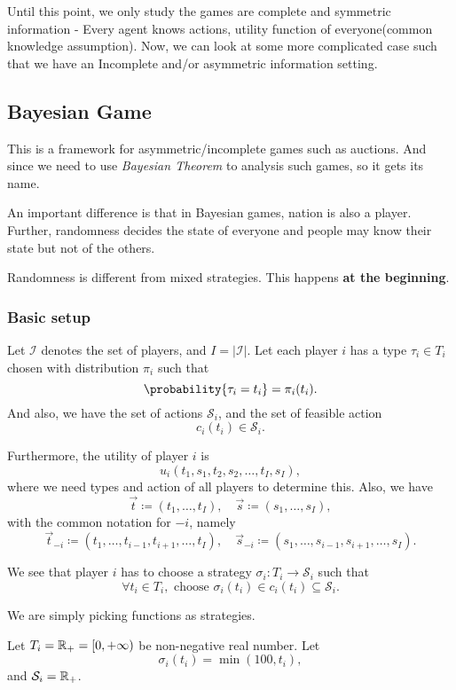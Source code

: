 \hr

Until this point, we only study the games are complete and symmetric information - Every agent knows actions, utility function of everyone(common knowledge assumption).
Now, we can look at some more complicated case such that we have an Incomplete and/or asymmetric information setting.

\subsection{Bayesian Game}
This is a framework for asymmetric/incomplete games such as auctions. And since we need to use \emph{Bayesian Theorem} to analysis such games, so
it gets its name.

An important difference is that in Bayesian games, nation is also a player. Further, randomness decides the state of everyone and people may
know their state but not of the others.

\begin{note}
	Randomness is different from mixed strategies. This happens \textbf{at the beginning}.
\end{note}

\subsubsection{Basic setup}
Let \(\mathcal{I} \) denotes the set of players, and \(I = \left\vert \mathcal{I}  \right\vert \). Let each player \(i\) has a type
\(\tau_{i}\in T_{i}\) chosen with distribution \(\pi_i\) such that
\[
	\probability{\tau_{i} = t_{i}} = \pi_i(t_{i}) .
\]
And also, we have the set of actions \(\mathcal{S}_{i}\), and the set of feasible action
\[
	c_{i}(t_{i})\in \mathcal{S}_{i}.
\]

Furthermore, the utility of player \(i\) is
\[
	u_{i}(t_1, s_1, t_2, s_2, \ldots , t_I, s_I),
\]
where we need types and action of all players to determine this. Also, we have
\[
	\vec{t}\coloneqq (t_1, \ldots , t_I),\quad \vec{s} \coloneqq (s_1, \ldots , s_I),
\]
with the common notation for \(-i\), namely
\[
	\vec{t}_{-i} \coloneqq (t_1, \ldots , t_{i-1}, t_{i+1}, \ldots , t_{I}),\quad \vec{s}_{-i} \coloneqq (s_1, \ldots , s_{i-1}, s_{i+1}, \ldots , s_{I}).
\]

We see that player \(i\) has to choose a strategy \(\sigma_{i}\colon T_{i}\to \mathcal{S}_{i}\) such that
\[
	\forall t_{i}\in T_{i}, \text{ choose }\sigma_{i}(t_{i})\in c_{i}(t_{i})\subseteq \mathcal{S}_{i}.
\]
\begin{intuition}
	We are simply picking functions as strategies.
\end{intuition}
\begin{eg}
	Let \(T_{i} = \mathbb{\MakeUppercase{R}}_+ = [0, +\infty )\) be non-negative real number. Let
	\[
		\sigma_{i}(t_{i}) = \min(100, t_{i}),
	\]
	and \(\mathcal{S}_{i} = \mathbb{\MakeUppercase{R}}_+\).

	\begin{figure}[H]
		\centering
		\label{fig:action-function-eg}
	\end{figure}
\end{eg}

